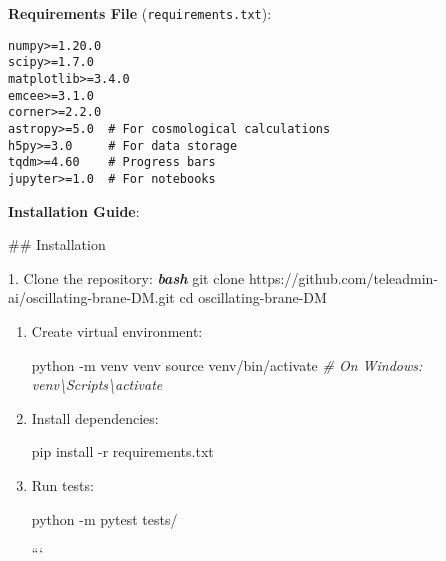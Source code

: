 \documentclass[
  11pt,
]{report}
\newenvironment{Shaded}{}{}
\newcommand{\AttributeTok}[1]{\textcolor[rgb]{0.49,0.56,0.16}{#1}}
\newcommand{\BuiltInTok}[1]{\textcolor[rgb]{0.00,0.50,0.00}{#1}}
\newcommand{\CommentTok}[1]{\textcolor[rgb]{0.38,0.63,0.69}{\textit{#1}}}
\newcommand{\ExtensionTok}[1]{#1}
\newcommand{\FunctionTok}[1]{\textcolor[rgb]{0.02,0.16,0.49}{#1}}
\newcommand{\InformationTok}[1]{\textcolor[rgb]{0.38,0.63,0.69}{\textbf{\textit{#1}}}}
\newcommand{\NormalTok}[1]{#1}
\newcommand{\SpecialStringTok}[1]{\textcolor[rgb]{0.73,0.40,0.53}{#1}}
\begin{document}
\textbf{Requirements File} (\texttt{requirements.txt}):

\begin{verbatim}
numpy>=1.20.0
scipy>=1.7.0
matplotlib>=3.4.0
emcee>=3.1.0
corner>=2.2.0
astropy>=5.0  # For cosmological calculations
h5py>=3.0     # For data storage
tqdm>=4.60    # Progress bars
jupyter>=1.0  # For notebooks
\end{verbatim}

\textbf{Installation Guide}:

\begin{Shaded}
\begin{Highlighting}[]
\FunctionTok{\#\# Installation}

\SpecialStringTok{1. }\NormalTok{Clone the repository:}
   \InformationTok{\textasciigrave{}\textasciigrave{}\textasciigrave{}bash}
   \FunctionTok{git}\NormalTok{ clone https://github.com/teleadmin{-}ai/oscillating{-}brane{-}DM.git}
   \BuiltInTok{cd}\NormalTok{ oscillating{-}brane{-}DM}
\end{Highlighting}
\end{Shaded}

\begin{enumerate}
\def\labelenumi{\arabic{enumi}.}
\setcounter{enumi}{1}
\item
  Create virtual environment:

\begin{Shaded}
\begin{Highlighting}[]
\ExtensionTok{python} \AttributeTok{{-}m}\NormalTok{ venv venv}
\BuiltInTok{source}\NormalTok{ venv/bin/activate  }\CommentTok{\# On Windows: venv\textbackslash{}Scripts\textbackslash{}activate}
\end{Highlighting}
\end{Shaded}
\item
  Install dependencies:

\begin{Shaded}
\begin{Highlighting}[]
\ExtensionTok{pip}\NormalTok{ install }\AttributeTok{{-}r}\NormalTok{ requirements.txt}
\end{Highlighting}
\end{Shaded}
\item
  Run tests:

\begin{Shaded}
\begin{Highlighting}[]
\ExtensionTok{python} \AttributeTok{{-}m}\NormalTok{ pytest tests/}
\end{Highlighting}
\end{Shaded}

  ```
\end{enumerate}
\end{document}
